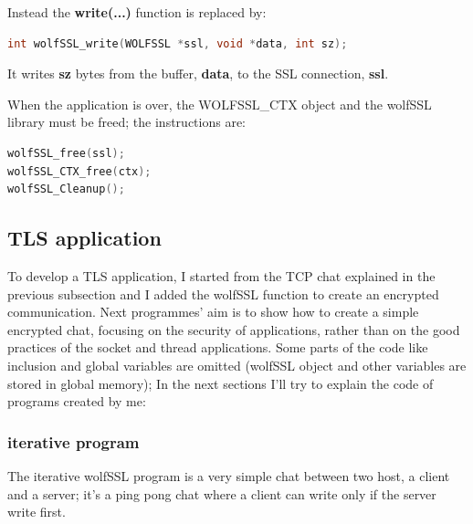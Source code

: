 \documentclass[a4paper,12pt]{article}
\begin{document}
Instead the \textbf{write(...)} function is replaced by:
\begin{lstlisting}[language=c]
int wolfSSL_write(WOLFSSL *ssl, void *data, int sz);
\end{lstlisting}
It writes \textbf{sz} bytes from the buffer, \textbf{data}, to the SSL connection, \textbf{ssl}.

When the application is over, the WOLFSSL\_CTX object and the wolfSSL library must be freed; the instructions are:
\begin{lstlisting}[language=c]
wolfSSL_free(ssl);
wolfSSL_CTX_free(ctx);
wolfSSL_Cleanup();
\end{lstlisting}


\subsection{TLS application}
To develop a TLS application, I started from the TCP chat explained in the previous subsection and I added the wolfSSL function to create an encrypted communication.
Next programmes’ aim is to show how to create a simple encrypted chat, focusing on the security of applications, rather than on the good practices of the socket and thread applications.
Some parts of the code like inclusion and global variables are omitted (wolfSSL object and other variables are stored in global memory); 
In the next sections I'll try to explain the code of programs created by me:
\subsubsection{iterative program}
The iterative wolfSSL program is a very simple chat between two host, a client and a server; it's a ping pong chat where a client can write only if the server write first.
\end{document}
